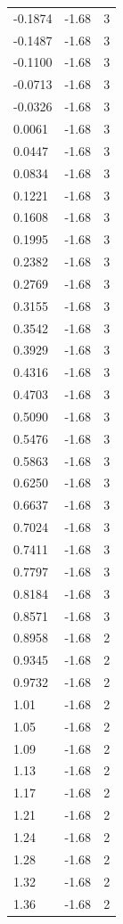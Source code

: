 \begin{longtable}{lrr}
  -0.1874 & -1.68 & 3 \\
  -0.1487 & -1.68 & 3 \\
  -0.1100 & -1.68 & 3 \\
  -0.0713 & -1.68 & 3 \\
  -0.0326 & -1.68 & 3 \\
  0.0061 & -1.68 & 3 \\
  0.0447 & -1.68 & 3 \\
  0.0834 & -1.68 & 3 \\
  0.1221 & -1.68 & 3 \\
  0.1608 & -1.68 & 3 \\
  0.1995 & -1.68 & 3 \\
  0.2382 & -1.68 & 3 \\
  0.2769 & -1.68 & 3 \\
  0.3155 & -1.68 & 3 \\
  0.3542 & -1.68 & 3 \\
  0.3929 & -1.68 & 3 \\
  0.4316 & -1.68 & 3 \\
  0.4703 & -1.68 & 3 \\
  0.5090 & -1.68 & 3 \\
  0.5476 & -1.68 & 3 \\
  0.5863 & -1.68 & 3 \\
  0.6250 & -1.68 & 3 \\
  0.6637 & -1.68 & 3 \\
  0.7024 & -1.68 & 3 \\
  0.7411 & -1.68 & 3 \\
  0.7797 & -1.68 & 3 \\
  0.8184 & -1.68 & 3 \\
  0.8571 & -1.68 & 3 \\
  0.8958 & -1.68 & 2 \\
  0.9345 & -1.68 & 2 \\
  0.9732 & -1.68 & 2 \\
  1.01 & -1.68 & 2 \\
  1.05 & -1.68 & 2 \\
  1.09 & -1.68 & 2 \\
  1.13 & -1.68 & 2 \\
  1.17 & -1.68 & 2 \\
  1.21 & -1.68 & 2 \\
  1.24 & -1.68 & 2 \\
  1.28 & -1.68 & 2 \\
  1.32 & -1.68 & 2 \\
  1.36 & -1.68 & 2 \\

\end{longtable}
